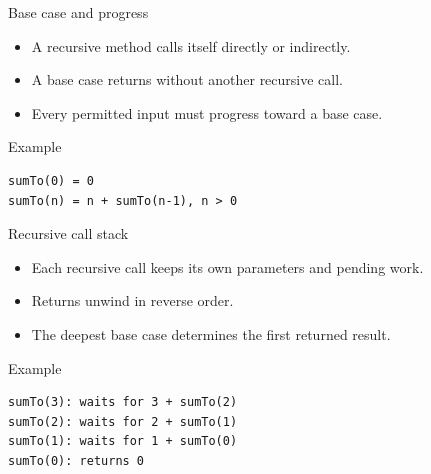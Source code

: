 \documentclass[10pt,aspectratio=169]{beamer}
\begin{document}
\begin{frame}[fragile,t]{Base case and progress}
\begin{itemize}
\item A recursive method calls itself directly or indirectly.
\item A base case returns without another recursive call.
\item Every permitted input must progress toward a base case.
\end{itemize}
\vspace{1mm}\begin{block}{Example}
\begin{lstlisting}
sumTo(0) = 0
sumTo(n) = n + sumTo(n-1), n > 0
\end{lstlisting}
\end{block}
\end{frame}

\begin{frame}[fragile,t]{Recursive call stack}
\begin{itemize}
\item Each recursive call keeps its own parameters and pending work.
\item Returns unwind in reverse order.
\item The deepest base case determines the first returned result.
\end{itemize}
\vspace{1mm}\begin{block}{Example}
\begin{lstlisting}
sumTo(3): waits for 3 + sumTo(2)
sumTo(2): waits for 2 + sumTo(1)
sumTo(1): waits for 1 + sumTo(0)
sumTo(0): returns 0
\end{lstlisting}
\end{block}
\end{frame}
\end{document}

